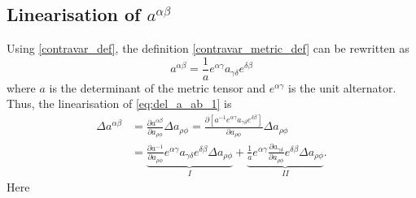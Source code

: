 \subsection{Linearisation of \texorpdfstring{$a^{\alpha \beta}$}{contravariant metric}}
Using \eqref{contravar_def}, the definition \eqref{contravar_metric_def} can be rewritten as
\begin{equation}\label{eq:del_a_ab_1}
    a^{\alpha \beta} = \frac{1}{a} e^{\alpha \gamma} a_{\gamma \delta} e^{\delta \beta}
\end{equation}
where $a$ is the determinant of the metric tensor and $e^{\alpha \gamma}$ is the unit alternator.
Thus, the linearisation of \eqref{eq:del_a_ab_1} is
\begin{equation}\label{eq:del_a_ab_2}
    \begin{split}
    \Delta a^{\alpha \beta} &= \frac{\partial a^{\alpha \beta}}{\partial a_{\rho \phi}} \Delta a_{\rho \phi} = \frac{\partial \left[ a^{-1} e^{\alpha \gamma} a_{\gamma \delta} e^{\delta \beta} \right]}{\partial a_{\rho \phi}} \Delta a_{\rho \phi}\\ &= \underbrace{\frac{\partial a^{-1}}{\partial a_{\rho \phi}} e^{\alpha \gamma} a_{\gamma \delta} e^{\delta \beta} \Delta a_{\rho \phi}}_{I} + \underbrace{\frac{1}{a} e^{\alpha \gamma} \frac{\partial a_{\gamma \delta}}{\partial a_{\rho \phi}} e^{\delta \beta} \Delta a_{\rho \phi}}_{II}.
    \end{split}
\end{equation}
Here
